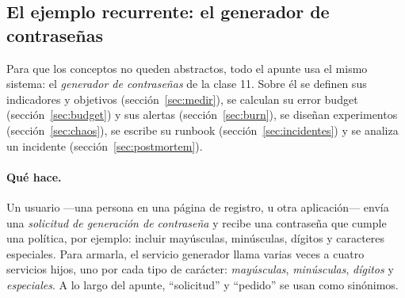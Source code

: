 \documentclass[variant=apuntes,cover=institutional,mode=screen]{ua-engineering-v6-article}
\begin{document}
\subsection{El ejemplo recurrente: el generador de contraseñas}

Para que los conceptos no queden abstractos, todo el apunte usa el mismo sistema: el \emph{generador de contraseñas} de la clase 11. Sobre él se definen sus indicadores y objetivos (sección~\ref{sec:medir}), se calculan su error budget (sección~\ref{sec:budget}) y sus alertas (sección~\ref{sec:burn}), se diseñan experimentos (sección~\ref{sec:chaos}), se escribe su runbook (sección~\ref{sec:incidentes}) y se analiza un incidente (sección~\ref{sec:postmortem}).

\paragraph{Qué hace.} Un usuario ---una persona en una página de registro, u otra aplicación--- envía una \emph{solicitud de generación de contraseña} y recibe una contraseña que cumple una política, por ejemplo: incluir mayúsculas, minúsculas, dígitos y caracteres especiales. Para armarla, el servicio generador llama varias veces a cuatro servicios hijos, uno por cada tipo de carácter: \emph{mayúsculas}, \emph{minúsculas}, \emph{dígitos} y \emph{especiales}. A lo largo del apunte, ``solicitud'' y ``pedido'' se usan como sinónimos.

\begin{center}
\end{center}
\end{document}
